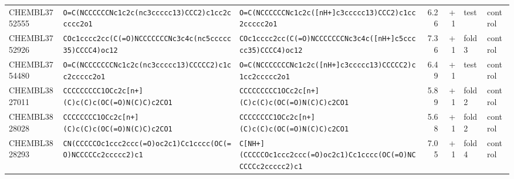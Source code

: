 \begin{longtable}{l p{4.4cm} p{4.4cm} r r l l}
CHEMBL3752555 & \texttt{O=\allowbreak{}C(\allowbreak{}NCCCCCCNc1c2c(\allowbreak{}nc3ccccc13)\allowbreak{}CCC2)\allowbreak{}c1cc2ccccc2o1} & \texttt{O=\allowbreak{}C(\allowbreak{}NCCCCCCNc1c2c(\allowbreak{}[nH+]\allowbreak{}c3ccccc13)\allowbreak{}CCC2)\allowbreak{}c1cc2ccccc2o1} & 6.26 & +1 & test & control \\
CHEMBL3752926 & \texttt{COc1cccc2cc(\allowbreak{}C(\allowbreak{}=\allowbreak{}O)\allowbreak{}NCCCCCCCNc3c4c(\allowbreak{}nc5ccccc35)\allowbreak{}CCCC4)\allowbreak{}oc12} & \texttt{COc1cccc2cc(\allowbreak{}C(\allowbreak{}=\allowbreak{}O)\allowbreak{}NCCCCCCCNc3c4c(\allowbreak{}[nH+]\allowbreak{}c5ccccc35)\allowbreak{}CCCC4)\allowbreak{}oc12} & 7.36 & +1 & fold 3 & control \\
CHEMBL3754480 & \texttt{O=\allowbreak{}C(\allowbreak{}NCCCCCCCNc1c2c(\allowbreak{}nc3ccccc13)\allowbreak{}CCCCC2)\allowbreak{}c1cc2ccccc2o1} & \texttt{O=\allowbreak{}C(\allowbreak{}NCCCCCCCNc1c2c(\allowbreak{}[nH+]\allowbreak{}c3ccccc13)\allowbreak{}CCCCC2)\allowbreak{}c1cc2ccccc2o1} & 6.49 & +1 & test & control \\
CHEMBL3827011 & \texttt{CCCCCCCCC1OCc2c[n+]\allowbreak{}(\allowbreak{}C)\allowbreak{}c(\allowbreak{}C)\allowbreak{}c(\allowbreak{}OC(\allowbreak{}=\allowbreak{}O)\allowbreak{}N(\allowbreak{}C)\allowbreak{}C)\allowbreak{}c2CO1} & \texttt{CCCCCCCCC1OCc2c[n+]\allowbreak{}(\allowbreak{}C)\allowbreak{}c(\allowbreak{}C)\allowbreak{}c(\allowbreak{}OC(\allowbreak{}=\allowbreak{}O)\allowbreak{}N(\allowbreak{}C)\allowbreak{}C)\allowbreak{}c2CO1} & 5.89 & +1 & fold 2 & control \\
CHEMBL3828028 & \texttt{CCCCCCCC1OCc2c[n+]\allowbreak{}(\allowbreak{}C)\allowbreak{}c(\allowbreak{}C)\allowbreak{}c(\allowbreak{}OC(\allowbreak{}=\allowbreak{}O)\allowbreak{}N(\allowbreak{}C)\allowbreak{}C)\allowbreak{}c2CO1} & \texttt{CCCCCCCC1OCc2c[n+]\allowbreak{}(\allowbreak{}C)\allowbreak{}c(\allowbreak{}C)\allowbreak{}c(\allowbreak{}OC(\allowbreak{}=\allowbreak{}O)\allowbreak{}N(\allowbreak{}C)\allowbreak{}C)\allowbreak{}c2CO1} & 5.68 & +1 & fold 2 & control \\
CHEMBL3828293 & \texttt{CN(\allowbreak{}CCCCCOc1ccc2ccc(\allowbreak{}=\allowbreak{}O)\allowbreak{}oc2c1)\allowbreak{}Cc1cccc(\allowbreak{}OC(\allowbreak{}=\allowbreak{}O)\allowbreak{}NCCCCCc2ccccc2)\allowbreak{}c1} & \texttt{C[NH+]\allowbreak{}(\allowbreak{}CCCCCOc1ccc2ccc(\allowbreak{}=\allowbreak{}O)\allowbreak{}oc2c1)\allowbreak{}Cc1cccc(\allowbreak{}OC(\allowbreak{}=\allowbreak{}O)\allowbreak{}NCCCCCc2ccccc2)\allowbreak{}c1} & 7.05 & +1 & fold 4 & control \\

\end{longtable}
